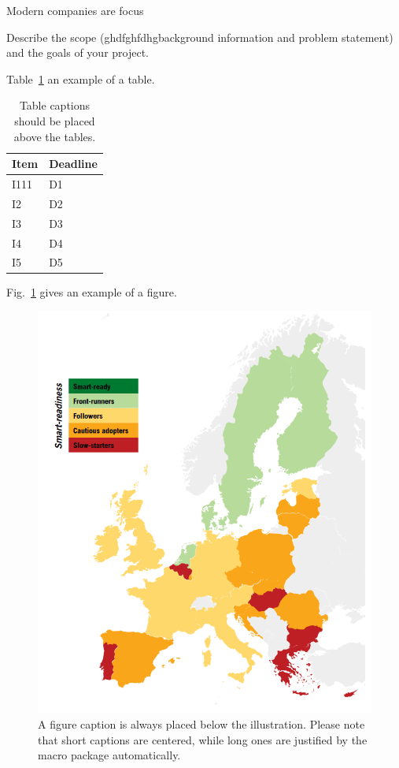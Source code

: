 \documentclass[runningheads]{llncs}
\begin{document}
Modern companies are focus




Describe the scope (ghdfghfdhgbackground information and problem statement) and the goals of your project.

Table~\ref{tab1} an example of a table.

\begin{table}
\caption{Table captions should be placed above the
tables.}\label{tab1}
\begin{tabular}{|l|l|}
\hline
Item & Deadline \\
\hline
I111 & D1 \\
I2 & D2 \\
I3 & D3 \\
I4 & D4 \\
I5 & D5 \\
\hline
\end{tabular}
\end{table}

Fig.~\ref{fig1} gives an example of a figure.

\begin{figure}
\includegraphics[width=\textwidth]{fig1}
\caption{A figure caption is always placed below the illustration.
Please note that short captions are centered, while long ones are
justified by the macro package automatically.} \label{fig1}
\end{figure}
\end{document}
